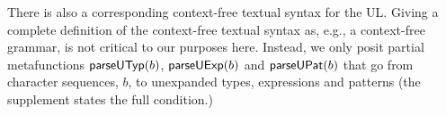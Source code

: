 \documentclass[acmsmall,review,anonymous]{acmart}\settopmatter{printfolios=true,printccs=false,printacmref=false}
\begin{document}
There is also a corresponding context-free textual syntax for the UL. 
Giving a complete definition of the context-free textual syntax as, e.g., a context-free grammar, is not critical to our purposes here. 
Instead, we only posit partial metafunctions $\mathsf{parseUTyp}(b)$, $\mathsf{parseUExp}(b)$ and $\mathsf{parseUPat}(b)$  that go from character sequences, $b$, to unexpanded types, expressions and patterns (the supplement states the full condition.) 
\end{document}
